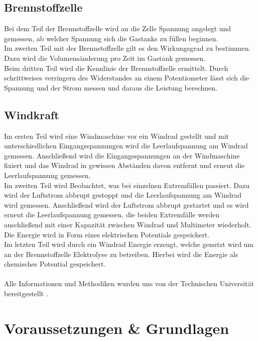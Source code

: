 \documentclass[12pt,a4paper,twoside]{article}
\begin{document}
\subsection{Brennstoffzelle}
Bei dem Teil der Brennstoffzelle wird an die Zelle Spannung angelegt und gemessen, ab welcher Spannung sich die Gastanks zu füllen beginnen. \\
Im zweiten Teil mit der Brennstoffzelle gilt es den Wirkungsgrad zu bestimmen. Dazu wird die Volumensänderung pro Zeit im Gastank gemessen. \\
Beim dritten Teil wird die Kennlinie der Brennstoffzelle ermittelt. Durch schrittweises verringern des Widerstandes an einem Potentiometer lässt sich die Spannung und der Strom messen und daraus die Leistung berechnen. 

\subsection{Windkraft}
Im ersten Teil wird eine Windmaschine vor ein Windrad gestellt und mit unterschiedlichen Eingangsspannungen wird die Leerlaufspannung am Windrad gemessen. 
Anschließend wird die Eingangsspannungen an der Windmaschine fixiert und das Windrad in gewissen Abständen davon entfernt und erneut die Leerlaufspannung gemessen. \\
Im zweiten Teil wird Beobachtet, was bei einzelnen Extremfällen passiert. Dazu wird der Luftstrom abbrupt gestoppt und die Leerlaufspannung am Windrad wird gemessen. 
Anschließend wird der Luftstrom abbrupt gestartet und es wird erneut die Leerlaufspannung gemessen. die beiden Extremfälle werden anschließend mit einer Kapazität zwischen Windrad und Multimeter wiederholt. 
Die Energie wird in Form eines elektrischen Potentials gespeichert. 
\\
Im letzten Teil wird durch ein Windrad Energie erzeugt, welche genutzt wird um an der Brennstoffzelle Elektrolyse zu betreiben. Hierbei wird die Energie als chemisches Potential gespeichert. 
\\
\\
Alle Informationen und Methodiken wurden uns von der Technischen Universität bereitgestellt \cite{teachcenter2}. 

\section{Voraussetzungen \& Grundlagen} %
\end{document}
